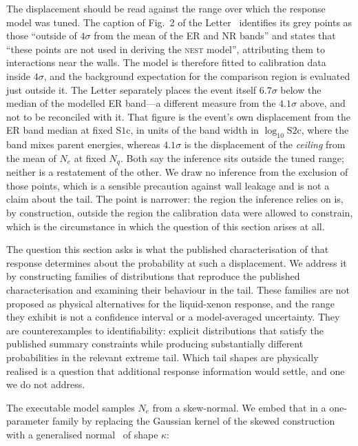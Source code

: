 \documentclass[11pt,a4paper]{article}
\begin{document}
The displacement should be read against the range over which the
response model was tuned. The caption of Fig.~2 of the
Letter~\cite{LZ:2026axp} identifies its grey points as those ``outside
of \(4\sigma\) from the mean of the ER and NR bands'' and states that
``these points are not used in deriving the \textsc{nest} model'',
attributing them to interactions near the walls. The model is therefore
fitted to calibration data inside \(4\sigma\), and the background
expectation for the comparison region is evaluated just outside it. The
Letter separately places the event itself \(6.7\sigma\) below the median
of the modelled ER band---a different measure from the \(4.1\sigma\)
above, and not to be reconciled with it. That figure is the event's own
displacement from the ER band median at fixed \(\mathrm{S1c}\), in units
of the band width in \(\log_{10}\mathrm{S2c}\), where the band mixes
parent energies, whereas \(4.1\sigma\) is the displacement of the
\emph{ceiling} from the mean of \(N_e\) at fixed \(N_q\). Both say the
inference sits outside the tuned range; neither is a restatement of the
other. We draw no inference from the
exclusion of those points, which is a sensible precaution against wall
leakage and is not a claim about the tail. The point is narrower: the
region the inference relies on is, by construction, outside the region
the calibration data were allowed to constrain, which is the
circumstance in which the question of this section arises at all.

The question this section asks is what the published characterisation of
that response determines about the probability at such a displacement.
We address it by constructing families of distributions that reproduce
the published characterisation and examining their behaviour in the
tail. These families are not proposed as physical alternatives for the
liquid-xenon response, and the range they exhibit is not a confidence
interval or a model-averaged uncertainty. They are counterexamples to
identifiability: explicit distributions that satisfy the published
summary constraints while producing substantially different
probabilities in the relevant extreme tail. Which tail shapes are
physically realised is a question that additional response information
would settle, and one we do not address.

The executable model samples \(N_e\) from a skew-normal. We embed that
in a one-parameter family by replacing the Gaussian kernel of the skewed
construction with a generalised normal~\cite{Subbotin,Nadarajah} of shape \(\kappa\):
\end{document}
